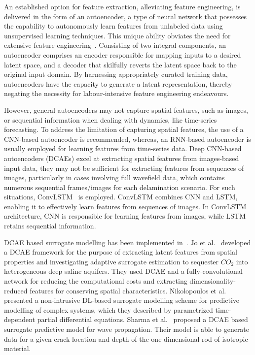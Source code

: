 An established option for feature extraction, alleviating feature engineering, is delivered in the form of an autoencoder, a type of neural network that possesses the capability to autonomously learn features from unlabeled data using unsupervised learning techniques. 
This unique ability obviates the need for extensive feature engineering~\cite{pinaya2020autoencoders, ardelean2023study, 
simpson2021machine}. 
Consisting of two integral components, an autoencoder comprises an encoder responsible for mapping inputs to a desired latent space, and a decoder that skilfully reverts the latent space back to the original input domain. 
By harnessing appropriately curated training data, autoencoders have the capacity to generate a latent representation, thereby negating the necessity for labour-intensive feature engineering endeavours.

However, general autoencoders may not capture spatial features, such as images, or sequential information when dealing with dynamics, like time-series forecasting. 
To address the limitation of capturing spatial features, the use of a CNN-based autoencoder is recommended, whereas, an RNN-based autoencoder is usually employed for learning features from time-series data.
Deep CNN-based autoencoders (DCAEs) excel at extracting spatial features from images-based input data, they may not be sufficient for extracting features from sequences of images, particularly in cases involving full wavefield data, which contains numerous sequential frames/images for each delamination scenario. 
For such situations, ConvLSTM~\cite{shi2015convolutional} is employed. 
ConvLSTM combines CNN and LSTM, enabling it to effectively learn features from sequences of images. 
In ConvLSTM architecture, CNN is responsible for learning features from images, while LSTM retains sequential information.

DCAE based surrogate modelling has been implemented in~\cite{jo2021adaptive, nikolopoulos2022non, sharma2022wave}. 
Jo et al.~\cite{jo2021adaptive} developed a DCAE framework for the purpose of extracting latent features from spatial properties and investigating adaptive surrogate estimation to sequester $CO_2$ into heterogeneous deep saline aquifers. 
They used DCAE and a fully-convolutional network for reducing the computational costs and extracting dimensionality-reduced features for conserving spatial characteristics. 
Nikolopoulos et al.~\cite{nikolopoulos2022non} presented a non-intrusive DL-based surrogate modelling scheme for predictive modelling of complex systems, which they described by parametrized time-dependent partial differential equations. 
Sharma et al.~\cite{sharma2022wave} proposed a DCAE based surrogate predictive model for wave propagation. 
Their model is able to generate data for a given crack location and depth of the one-dimensional rod of isotropic material.

